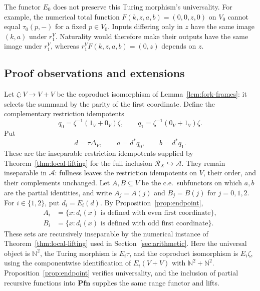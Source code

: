 \documentclass[11pt]{article}
\newcommand{\N}{\mathbb N}
\newcommand{\Pfn}{\mathbf{Pfn}}
\begin{document}
The functor $E_0$ does not preserve this Turing morphism's universality.
For example, the numerical total function
$F(k,z,a,b)=(0,0,z,0)$ on $V_0$ cannot equal
$\tau_0(p,-)$ for a fixed $p\in V_0$.
Inputs differing only in $z$ have the same image $(k,a)$ under
$r_1^V$. Naturality would therefore make their outputs have the
same image under $r_1^V$, whereas
$r_1^V F(k,z,a,b)=(0,z)$ depends on $z$.

\subsection{Proof observations and extensions}

Let $\zeta:V\to V+V$ be the coproduct isomorphism of
Lemma~\ref{lem:fork-frames}: it selects the summand by the parity
of the first coordinate. Define the complementary restriction idempotents
\[
 q_0=\zeta^{-1}(1_V+0_V)\zeta,\qquad
 q_1=\zeta^{-1}(0_V+1_V)\zeta.
\]
Put
\[
 d=\tau\Delta_V,\qquad a=d^*q_0,\qquad b=d^*q_1.
\]
These are the inseparable restriction idempotents supplied by
Theorem~\ref{thm:local-lifting} for the full inclusion
$\mathscr R_X\hookrightarrow\mathcal A$. They remain inseparable
in $\mathcal A$: fullness leaves the restriction idempotents on $V$, their order,
and their complements unchanged.
Let $A,B\subseteq V$ be the c.e.\ subfunctors on which $a,b$
are the partial identities, and write $A_j=A(j)$ and $B_j=B(j)$
for $j=0,1,2$. For $i\in\{1,2\}$, put $d_i=E_i(d)$.
By Proposition~\ref{prop:endpoint},
\begin{align*}
 A_i&=\{x:d_i(x)\text{ is defined with even first coordinate}\},\\
 B_i&=\{x:d_i(x)\text{ is defined with odd first coordinate}\}.
\end{align*}
These sets are recursively inseparable by the numerical instance
of Theorem~\ref{thm:local-lifting} used in
Section~\ref{sec:arithmetic}. Here the universal object is $\N^2$,
the Turing morphism is $E_i\tau$, and the coproduct isomorphism
is $E_i\zeta$, using the componentwise identification of
$E_i(V+V)$ with $\N^2+\N^2$. Proposition~\ref{prop:endpoint}
verifies universality, and the inclusion of partial recursive
functions into $\Pfn$ supplies the same range functor and lifts.
\end{document}
